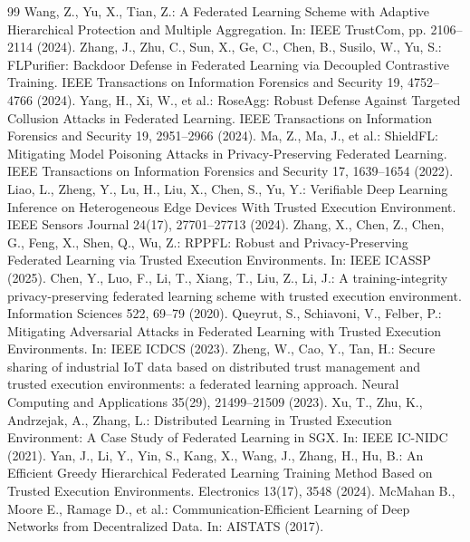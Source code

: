 \documentclass[runningheads]{llncs}
\begin{document}
\begin{thebibliography}{99}
 Wang, Z., Yu, X., Tian, Z.: A Federated Learning Scheme with Adaptive Hierarchical Protection and Multiple Aggregation. In: IEEE TrustCom, pp. 2106--2114 (2024).
 Zhang, J., Zhu, C., Sun, X., Ge, C., Chen, B., Susilo, W., Yu, S.: FLPurifier: Backdoor Defense in Federated Learning via Decoupled Contrastive Training. IEEE Transactions on Information Forensics and Security 19, 4752--4766 (2024).
 Yang, H., Xi, W., et al.: RoseAgg: Robust Defense Against Targeted Collusion Attacks in Federated Learning. IEEE Transactions on Information Forensics and Security 19, 2951--2966 (2024).
 Ma, Z., Ma, J., et al.: ShieldFL: Mitigating Model Poisoning Attacks in Privacy-Preserving Federated Learning. IEEE Transactions on Information Forensics and Security 17, 1639--1654 (2022).
 Liao, L., Zheng, Y., Lu, H., Liu, X., Chen, S., Yu, Y.: Verifiable Deep Learning Inference on Heterogeneous Edge Devices With Trusted Execution Environment. IEEE Sensors Journal 24(17), 27701--27713 (2024).
 Zhang, X., Chen, Z., Chen, G., Feng, X., Shen, Q., Wu, Z.: RPPFL: Robust and Privacy-Preserving Federated Learning via Trusted Execution Environments. In: IEEE ICASSP (2025).
 Chen, Y., Luo, F., Li, T., Xiang, T., Liu, Z., Li, J.: A training-integrity privacy-preserving federated learning scheme with trusted execution environment. Information Sciences 522, 69--79 (2020).
 Queyrut, S., Schiavoni, V., Felber, P.: Mitigating Adversarial Attacks in Federated Learning with Trusted Execution Environments. In: IEEE ICDCS (2023).
 Zheng, W., Cao, Y., Tan, H.: Secure sharing of industrial IoT data based on distributed trust management and trusted execution environments: a federated learning approach. Neural Computing and Applications 35(29), 21499--21509 (2023).
 Xu, T., Zhu, K., Andrzejak, A., Zhang, L.: Distributed Learning in Trusted Execution Environment: A Case Study of Federated Learning in SGX. In: IEEE IC-NIDC (2021).
 Yan, J., Li, Y., Yin, S., Kang, X., Wang, J., Zhang, H., Hu, B.: An Efficient Greedy Hierarchical Federated Learning Training Method Based on Trusted Execution Environments. Electronics 13(17), 3548 (2024).
 McMahan B., Moore E., Ramage D., et al.: Communication-Efficient Learning of Deep Networks from Decentralized Data. In: AISTATS (2017).
\end{thebibliography}
\end{document}
